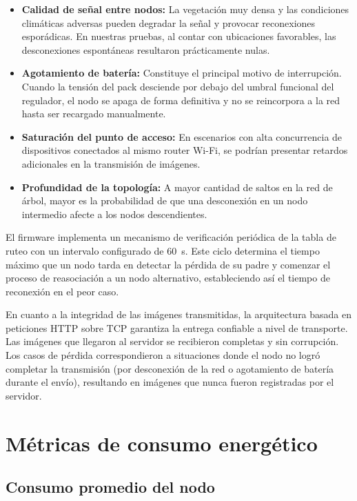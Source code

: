 \documentclass[a4paper, 12pt]{report}
\begin{document}
\begin{itemize}
  \item \textbf{Calidad de señal entre nodos:} La vegetación muy densa y las condiciones climáticas adversas pueden degradar la señal y provocar reconexiones esporádicas. En nuestras pruebas, al contar con ubicaciones favorables, las desconexiones espontáneas resultaron prácticamente nulas.
  \item \textbf{Agotamiento de batería:} Constituye el principal motivo de interrupción. Cuando la tensión del pack desciende por debajo del umbral funcional del regulador, el nodo se apaga de forma definitiva y no se reincorpora a la red hasta ser recargado manualmente.
  \item \textbf{Saturación del punto de acceso:} En escenarios con alta concurrencia de dispositivos conectados al mismo router Wi-Fi, se podrían presentar retardos adicionales en la transmisión de imágenes.
  \item \textbf{Profundidad de la topología:} A mayor cantidad de saltos en la red de árbol, mayor es la probabilidad de que una desconexión en un nodo intermedio afecte a los nodos descendientes.
\end{itemize}

El firmware implementa un mecanismo de verificación periódica de la tabla de ruteo con un intervalo configurado de \qty{60}{s}. Este ciclo determina el tiempo máximo que un nodo tarda en detectar la pérdida de su padre y comenzar el proceso de reasociación a un nodo alternativo, estableciendo así el tiempo de reconexión en el peor caso.

En cuanto a la integridad de las imágenes transmitidas, la arquitectura basada en peticiones HTTP sobre TCP garantiza la entrega confiable a nivel de transporte. Las imágenes que llegaron al servidor se recibieron completas y sin corrupción. Los casos de pérdida correspondieron a situaciones donde el nodo no logró completar la transmisión (por desconexión de la red o agotamiento de batería durante el envío), resultando en imágenes que nunca fueron registradas por el servidor.

\section{Métricas de consumo energético}

\subsection{Consumo promedio del nodo}
\end{document}
